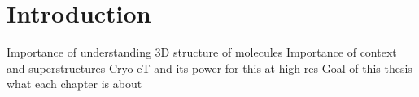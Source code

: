 \chapter{Introduction}\label{introduction}

\begin{outline}
\1 Importance of understanding 3D structure of molecules
\1 Importance of context and superstructures
\1 Cryo-eT and its power for this at high res
\1 Goal of this thesis
\1 what each chapter is about
\end{outline}
